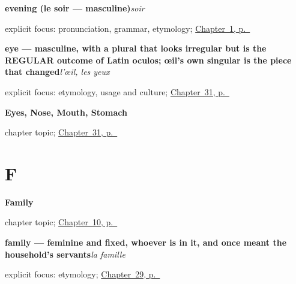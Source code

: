 \noindent\begin{minipage}[t]{\linewidth}
\raggedright
\textbf{evening (le soir — masculine)}\enspace\emph{soir}\par
\footnotesize explicit focus: pronunciation, grammar, etymology; \hyperref[ch:greetings]{Chapter~1, p.~\pageref*{ch:greetings}}
\end{minipage}\par\smallskip

\noindent\begin{minipage}[t]{\linewidth}
\raggedright
\textbf{eye — masculine, with a plural that looks irregular but is the REGULAR outcome of Latin oculos; œil's own singular is the piece that changed}\enspace\emph{l'œil, les yeux}\par
\footnotesize explicit focus: etymology, usage and culture; \hyperref[ch:fr-eyes-nose-mouth-stomach]{Chapter~31, p.~\pageref*{ch:fr-eyes-nose-mouth-stomach}}
\end{minipage}\par\smallskip

\noindent\begin{minipage}[t]{\linewidth}
\raggedright
\textbf{Eyes, Nose, Mouth, Stomach}\par
\footnotesize chapter topic; \hyperref[ch:fr-eyes-nose-mouth-stomach]{Chapter~31, p.~\pageref*{ch:fr-eyes-nose-mouth-stomach}}
\end{minipage}\par\smallskip

\section*{F}

\noindent\begin{minipage}[t]{\linewidth}
\raggedright
\textbf{Family}\par
\footnotesize chapter topic; \hyperref[ch:family]{Chapter~10, p.~\pageref*{ch:family}}
\end{minipage}\par\smallskip

\noindent\begin{minipage}[t]{\linewidth}
\raggedright
\textbf{family — feminine and fixed, whoever is in it, and once meant the household's servants}\enspace\emph{la famille}\par
\footnotesize explicit focus: etymology; \hyperref[ch:fr-the-people-you-introduce]{Chapter~29, p.~\pageref*{ch:fr-the-people-you-introduce}}
\end{minipage}\par\smallskip

